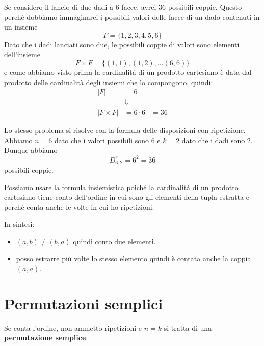 \begin{example}
	Se considero il lancio di due dadi a 6 facce, avrei 36 possibili coppie. Questo perch\'e
	dobbiamo immaginarci i possibili valori delle facce di un dado contenuti in un insieme
	\begin{equation*}
		F = \{ 1, 2, 3, 4, 5, 6 \}
	\end{equation*}
	Dato che i dadi lanciati sono due, le possibili coppie di valori sono elementi dell'insieme
	\begin{equation*}
		F \times F = \{ (1, 1), (1, 2), \dots (6, 6) \}
	\end{equation*}
	e come abbiamo visto prima la cardinalit\`a di un prodotto cartesiano \`e data dal prodotto
	delle cardinalit\`a degli insiemi che lo compongono, quindi:
	\begin{equation*}
		\begin{array}{lll}
			|F|          & = 6                \\
			             & \Downarrow         \\
			|F \times F| & = 6 \cdot 6 & = 36
		\end{array}
	\end{equation*}

	Lo stesso problema si risolve con la formula delle disposizioni con ripetizione. Abbiamo
	$n = 6$ dato che i valori possibili sono 6 e $k = 2$ dato che i dadi sono 2. Dunque abbiamo
	\begin{equation*}
		D_{6, 2}^r = 6^2 = 36
	\end{equation*}
	possibili coppie.
\end{example}

\begin{observation}
	Possiamo usare la formula insiemistica poich\'e la cardinalit\`a di un prodotto cartesiano
	tiene conto dell'ordine in cui sono gli elementi della tupla estratta e perch\'e conta
	anche le volte in cui ho ripetizioni.

	In sintesi:
	\begin{itemize}
		\item $(a, b) \neq (b, a)$ quindi conto due elementi.
		\item posso estrarre pi\`u volte lo stesso elemento quindi \`e contata anche la
		      coppia $(a, a)$.
	\end{itemize}

\end{observation}


\section{Permutazioni semplici}
\begin{definition}
	Se conta l'ordine, non ammetto ripetizioni e $n = k$ si tratta di una
	\textbf{permutazione semplice}.
\end{definition}


